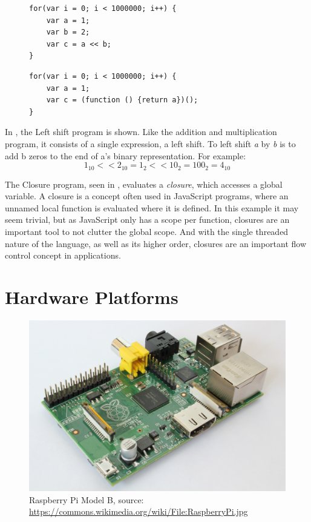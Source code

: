\begin{figure}[h!]
\begin{minipage}{0.45\textwidth}
\begin{verbatim}
for(var i = 0; i < 1000000; i++) {
    var a = 1;
    var b = 2;
    var c = a << b;
}
\end{verbatim}
\label{lst:shift}
\end{minipage}\hfill
\begin{minipage}{0.45\textwidth}
\begin{verbatim}
for(var i = 0; i < 1000000; i++) {
    var a = 1;
    var c = (function () {return a})();
}
\end{verbatim}
\label{lst:closure}
\end{minipage}
\end{figure}

In , the Left shift program is shown.
Like the addition and multiplication program, it consists of a single expression, a left shift.
To left shift \emph{a} by \emph{b} is to add b zeros to the end of a's binary representation.
For example:
\[1_{10} << 2_{10} = 1_{2} << 10_{2} = 100_{2} = 4_{10}\]

The Closure program, seen in , evaluates a \emph{closure}, which accesses a global variable.
A closure is a concept often used in JavaScript programs, where an unnamed local function is evaluated where it is defined.
In this example it may seem trivial, but as JavaScript only has a scope per function, closures are an important tool to not clutter the global scope.
And with the single threaded nature of the language, as well as its higher order, closures are an important flow control concept in applications.




\section{Hardware Platforms}

\begin{figure}[h!]
\centering
\includegraphics[scale=0.08]{fig/pics/RaspberryPi.jpg}
\caption{Raspberry Pi Model B, {\tiny source: \url{https://commons.wikimedia.org/wiki/File:RaspberryPi.jpg}}}
\label{fig:raspberrypi}
\end{figure}

